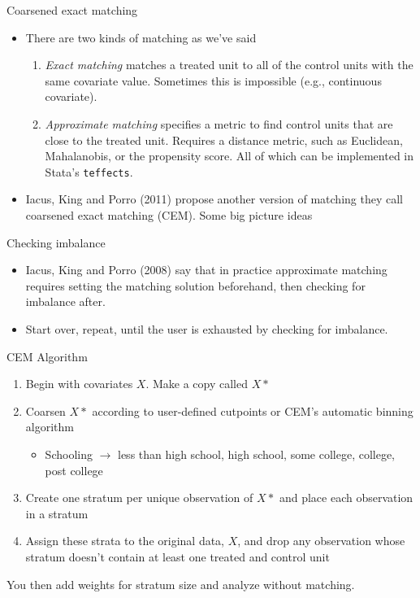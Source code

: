 \documentclass{beamer}
\begin{document}
\begin{frame}{Coarsened exact matching}
	
\begin{itemize}
\item There are two kinds of matching as we've said
	\begin{enumerate}
	\item \emph{Exact matching} matches a treated unit to all of the control units with the same covariate value. Sometimes this is impossible (e.g., continuous covariate). 
	\item \emph{Approximate matching} specifies a metric to find control units that are close to the treated unit. Requires a distance metric, such as Euclidean, Mahalanobis, or the propensity score.  All of which can be implemented in Stata's \texttt{teffects}.
	\end{enumerate}
\item 	Iacus, King and Porro (2011) propose another version of matching they call coarsened exact matching (CEM). Some big picture ideas
\end{itemize}
\end{frame}

\begin{frame}{Checking imbalance}

\begin{itemize}
\item Iacus, King and Porro (2008) say that in practice approximate matching requires setting the matching solution beforehand, then checking for imbalance after.  
\item Start over, repeat, until the user is exhausted by checking for imbalance.
\end{itemize}

\end{frame}

\begin{frame}{CEM Algorithm}
	
\begin{enumerate}
\item Begin with covariates $X$. Make a copy called $X*$
\item Coarsen $X*$ according to user-defined cutpoints or CEM's automatic binning algorithm
	\begin{itemize}
	\item Schooling $\rightarrow$ less than high school, high school, some college, college, post college
	\end{itemize}
\item Create one stratum per unique observation of $X*$ and place each observation in a stratum
\item Assign these strata to the original data, $X$, and drop any observation whose stratum doesn't contain at least one treated and control unit
\end{enumerate}

You then add weights for stratum size and analyze without matching.

\end{frame}
\end{document}
